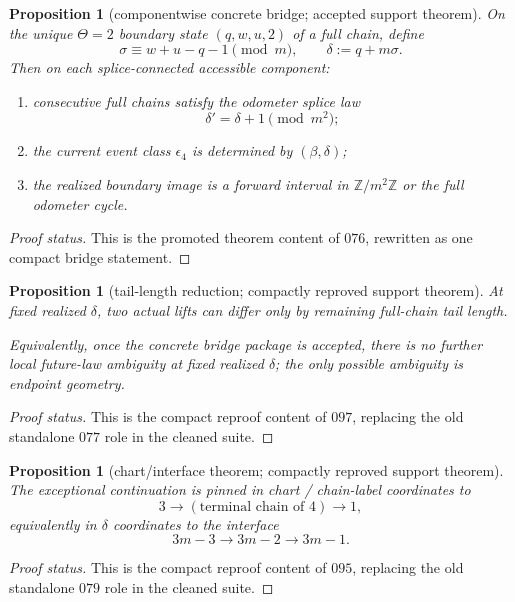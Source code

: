 \documentclass[11pt]{article}
\newtheorem{proposition}[theorem]{Proposition}
\newcommand{\Z}{\mathbb Z}
\begin{document}
\begin{proposition}[componentwise concrete bridge; accepted support theorem]
On the unique $\Theta=2$ boundary state $(q,w,u,2)$ of a full chain, define
\[
\sigma \equiv w+u-q-1 \pmod m,
\qquad
\delta := q+m\sigma.
\]
Then on each splice-connected accessible component:
\begin{enumerate}[label=\textup{(\arabic*)},leftmargin=2.5em]
\item consecutive full chains satisfy the odometer splice law
\[
\delta' = \delta+1 \pmod{m^2};
\]
\item the current event class $\epsilon_4$ is determined by $(\beta,\delta)$;
\item the realized boundary image is a forward interval in $\Z/m^2\Z$ or the
full odometer cycle.
\end{enumerate}
\end{proposition}

\begin{proof}[Proof status]
This is the promoted theorem content of $076$, rewritten as one compact bridge
statement.
\end{proof}

\begin{proposition}[tail-length reduction; compactly reproved support theorem]
At fixed realized $\delta$, two actual lifts can differ only by remaining
full-chain tail length.

Equivalently, once the concrete bridge package is accepted, there is no further
local future-law ambiguity at fixed realized $\delta$; the only possible
ambiguity is endpoint geometry.
\end{proposition}

\begin{proof}[Proof status]
This is the compact reproof content of $097$, replacing the old standalone
$077$ role in the cleaned suite.
\end{proof}

\begin{proposition}[chart/interface theorem; compactly reproved support theorem]
The exceptional continuation is pinned in chart / chain-label coordinates to
\[
3 \to (\text{terminal chain of }4)\to 1,
\]
equivalently in $\delta$ coordinates to the interface
\[
3m-3 \to 3m-2 \to 3m-1.
\]
\end{proposition}

\begin{proof}[Proof status]
This is the compact reproof content of $095$, replacing the old standalone
$079$ role in the cleaned suite.
\end{proof}
\end{document}
